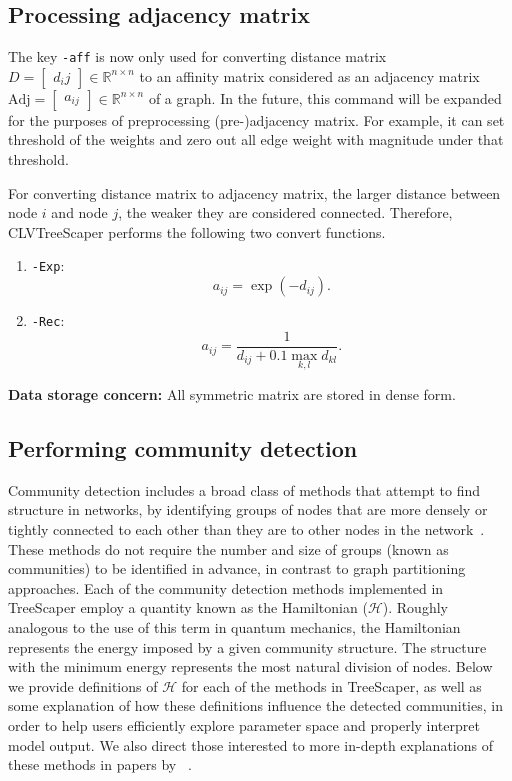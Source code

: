 \documentclass[11pt]{article}
\begin{document}
\subsection{Processing adjacency matrix}

The key {\tt -aff} is now only used for converting distance matrix $D = \begin{bmatrix}
	d_ij
\end{bmatrix}\in \mathbb{R}^{n\times n}$ to an affinity matrix considered as an adjacency matrix $\text{Adj}=\begin{bmatrix}
	a_{ij}
\end{bmatrix}\in \mathbb{R}^{n\times n}$ of a graph. In the future, this command will be expanded for the purposes of preprocessing (pre-)adjacency matrix. For example, it can set threshold of the weights and zero out all edge weight with magnitude under that threshold.


For converting distance matrix to adjacency matrix, the larger distance between node $i$ and node $j$, the weaker they are considered connected. Therefore, CLVTreeScaper performs the following two convert functions.

\begin{enumerate}
	\item {\tt -Exp}: $$a_{ij}=\exp(-d_{ij}).$$
	\item {\tt -Rec}: $$a_{ij} = \frac{1}{d_{ij} + 0.1 \max_{k,l}d_{kl}}.$$ 
\end{enumerate}

{\bf Data storage concern:} All symmetric matrix are stored in dense form.
\subsection{Performing community detection}

Community detection includes a broad class of methods that attempt to find structure in
networks, by identifying groups of nodes that are more densely or tightly connected to each
other than they are to other nodes in the network~\citep{Newman:2010}. These methods do not
require the number and size of groups (known as communities) to be identified in advance,
in contrast to graph partitioning approaches. Each of the community detection methods
implemented in TreeScaper employ a quantity known as the Hamiltonian ($\mathcal{H}$). Roughly
analogous to the use of this term in quantum mechanics, the Hamiltonian represents the
energy imposed by a given community structure. The structure with the minimum energy
represents the most natural division of nodes. Below we provide definitions of $\mathcal{H}$ for each of the methods in TreeScaper, as well as some explanation of how these definitions influence the
detected communities, in order to help users efficiently explore parameter space and properly
interpret model output. We also direct those interested to more in-depth explanations of
these methods in papers by ~\citealp{Fortunato:2010,RB:2006,RAK:2007,TB:2009,TVDN:2011,Traag:2014}. \\
\end{document}
